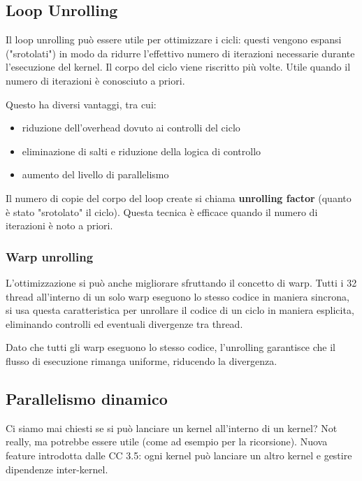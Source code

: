 \subsection{Loop Unrolling}

Il loop unrolling può essere utile per ottimizzare i cicli: questi vengono espansi ("srotolati") in modo da ridurre l'effettivo numero di iterazioni necessarie durante l'esecuzione del kernel. Il corpo del ciclo viene riscritto più volte. Utile quando il numero di iterazioni è conosciuto a priori. 

Questo ha diversi vantaggi, tra cui: 
\begin{itemize}
	\item riduzione dell'overhead dovuto ai controlli del ciclo
	
	\item eliminazione di salti e riduzione della logica di controllo 
	
	\item aumento del livello di parallelismo
\end{itemize}

Il numero di copie del corpo del loop create si chiama \textbf{unrolling factor} (quanto è stato "srotolato" il ciclo). Questa tecnica è efficace quando il numero di iterazioni è noto a priori.

\subsubsection{Warp unrolling}

L'ottimizzazione si può anche migliorare sfruttando il concetto di warp. Tutti i 32 thread all'interno di un solo warp eseguono lo stesso codice in maniera sincrona, si usa questa caratteristica per unrollare il codice di un ciclo in maniera esplicita, eliminando controlli ed eventuali divergenze tra thread. 

Dato che tutti gli warp eseguono lo stesso codice, l'unrolling garantisce che il flusso di esecuzione rimanga uniforme, riducendo la divergenza. 


\subsection{Parallelismo dinamico}

Ci siamo mai chiesti se si può lanciare un kernel all'interno di un kernel? Not really, ma potrebbe essere utile (come ad esempio per la ricorsione). Nuova feature introdotta dalle CC 3.5: ogni kernel può lanciare un altro kernel e gestire dipendenze inter-kernel. 

